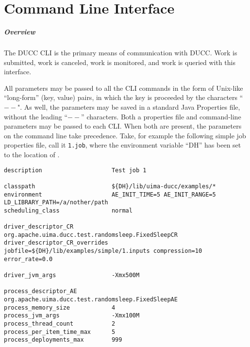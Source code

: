 % 
% 
% 
% 
\ifpdf
\else
{}
\fi
\chapter{Command Line Interface}
\label{chap:cli}

    \paragraph{Overview}
    The DUCC CLI is the primary means of communication with DUCC.  Work is submitted, work is
    canceled, work is monitored, and work is queried with this interface.

    All parameters may be passed to all the CLI commands in the form of Unix-like ``long-form''
    (key, value) pairs, in which the key is proceeded by the characters ``$--$".  As well, the
    parameters may be saved in a standard Java Properties file, without the leading ``$--$''
    characters.  Both a properties file and command-line parameters may be passed to each CLI.  When
    both are present, the parameters on the command line take precedence.  Take, for example
    the following simple job properties file, call it {\tt 1.job}, where the environment variable
    ``DH'' has been set to the location of \ducchome.
\begin{verbatim}
description                    Test job 1

classpath                      ${DH}/lib/uima-ducc/examples/*
environment                    AE_INIT_TIME=5 AE_INIT_RANGE=5 LD_LIBRARY_PATH=/a/nother/path
scheduling_class               normal

driver_descriptor_CR           org.apache.uima.ducc.test.randomsleep.FixedSleepCR
driver_descriptor_CR_overrides jobfile=${DH}/lib/examples/simple/1.inputs compression=10
error_rate=0.0

driver_jvm_args                -Xmx500M

process_descriptor_AE          org.apache.uima.ducc.test.randomsleep.FixedSleepAE
process_memory_size            4
process_jvm_args               -Xmx100M 
process_thread_count           2
process_per_item_time_max      5
process_deployments_max        999

\end{verbatim}


